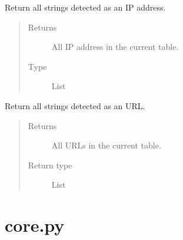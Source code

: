 \documentclass[letterpaper,10pt,oneside]{sphinxmanual}
\begin{document}
\begin{fulllineitems}
\begin{fulllineitems}
\begin{quote}
\begin{description}
\begin{itemize}
\end{itemize}

\end{description}\end{quote}

\end{fulllineitems}


\begin{fulllineitems}
\label{index:lib.database.Database.getIpAddresses}
Return all strings detected as an IP address.
\begin{quote}\begin{description}
\item[{Returns}] \leavevmode
All IP address in the current table.

\item[{Type}] \leavevmode
List

\end{description}\end{quote}

\end{fulllineitems}


\begin{fulllineitems}
\label{index:lib.database.Database.getUrls}
Return all strings detected as an URL.
\begin{quote}\begin{description}
\item[{Returns}] \leavevmode
All URLs in the current table.

\item[{Return type}] \leavevmode
List

\end{description}\end{quote}

\end{fulllineitems}


\end{fulllineitems}



\section{core.py}
\label{index:module-lib.core}\label{index:core-py}
\end{document}
